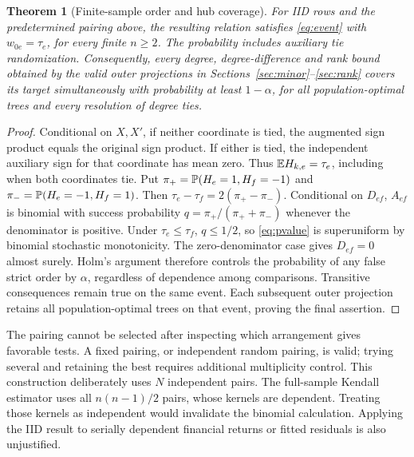 \documentclass[11pt]{article}
\theoremstyle{plain}
\newtheorem{theorem}{Theorem}\newtheorem{proposition}[theorem]{Proposition}\newtheorem{lemma}[theorem]{Lemma}
\theoremstyle{definition}\newtheorem{remark}{Remark}\newtheorem{example}{Example}
\begin{document}
\begin{theorem}[Finite-sample order and hub coverage]\label{thm:finite}
For IID rows and the predetermined pairing above, the resulting relation satisfies \eqref{eq:event} with $w_{0e}=\tau_e$, for every finite $n\ge2$. The probability includes auxiliary tie randomization. Consequently, every degree, degree-difference and rank bound obtained by the valid outer projections in Sections~\ref{sec:minor}--\ref{sec:rank} covers its target simultaneously with probability at least $1-\alpha$, for all population-optimal trees and every resolution of degree ties.
\end{theorem}
\begin{proof}
Conditional on $X,X'$, if neither coordinate is tied, the augmented sign product equals the original sign product. If either is tied, the independent auxiliary sign for that coordinate has mean zero. Thus $\mathbb E H_{k,e}=\tau_e$, including when both coordinates tie. Put $\pi_+=\mathbb P(H_e=1,H_f=-1)$ and $\pi_-=\mathbb P(H_e=-1,H_f=1)$. Then $\tau_e-\tau_f=2(\pi_+-\pi_-)$. Conditional on $D_{ef}$, $A_{ef}$ is binomial with success probability $q=\pi_+/(\pi_++\pi_-)$ whenever the denominator is positive. Under $\tau_e\le\tau_f$, $q\le1/2$, so \eqref{eq:pvalue} is superuniform by binomial stochastic monotonicity. The zero-denominator case gives $D_{ef}=0$ almost surely. Holm's argument therefore controls the probability of any false strict order by $\alpha$, regardless of dependence among comparisons. Transitive consequences remain true on the same event. Each subsequent outer projection retains all population-optimal trees on that event, proving the final assertion.
\end{proof}

The pairing cannot be selected after inspecting which arrangement gives favorable tests. A fixed pairing, or independent random pairing, is valid; trying several and retaining the best requires additional multiplicity control. This construction deliberately uses $N$ independent pairs. The full-sample Kendall estimator uses all $n(n-1)/2$ pairs, whose kernels are dependent. Treating those kernels as independent would invalidate the binomial calculation. Applying the IID result to serially dependent financial returns or fitted residuals is also unjustified.
\end{document}
